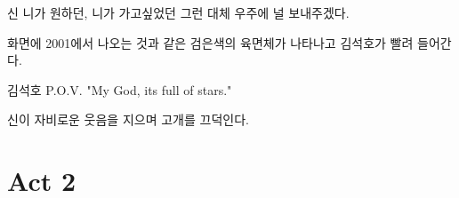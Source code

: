 \documentclass{screenplay}
\begin{document}
    \begin{dialogue}{신}
        니가 원하던, 니가 가고싶었던 그런 대체 우주에 널 보내주겠다.
    \end{dialogue}
    
    화면에 2001에서 나오는 것과 같은 검은색의 육면체가 나타나고 김석호가 빨려 들어간다.
    
    \begin{dialogue}{김석호}
        P.O.V. "My God, its full of stars."
    \end{dialogue}
    
    신이 자비로운 웃음을 지으며 고개를 끄덕인다.
    
    \fadeout
    
    \section{Act 2}
\end{document}
